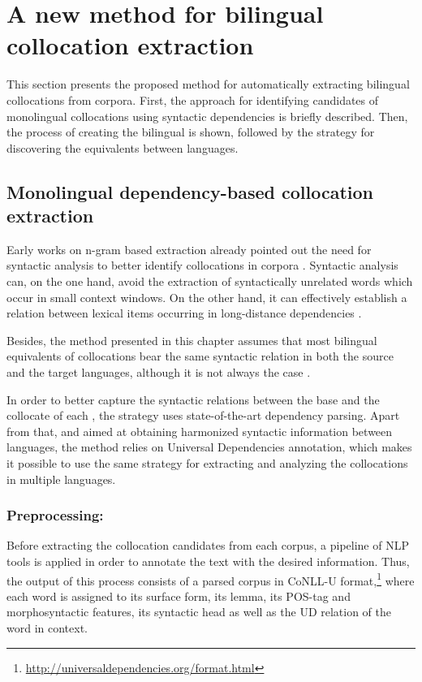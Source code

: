 \documentclass[output=paper
,modfonts
,nonflat]{langsci/langscibook}
\begin{document}
%
\section{A new method for bilingual collocation extraction}
\label{garcia:sec:method}
This section presents the proposed method for automatically extracting bilingual collocations from corpora.
First, the approach for identifying candidates of monolingual collocations using syntactic dependencies
is briefly described. Then, the process of creating the bilingual  is shown,
followed by the strategy for discovering the  equivalents between languages.

%
\subsection{Monolingual dependency-based collocation extraction}
\label{garcia:sec:monolingual}
Early works on n-gram based  extraction already pointed out the
need for syntactic analysis to better identify collocations in corpora
\citep{smadja1993,lin1999}. Syntactic analysis can, on the one hand, avoid the
extraction of syntactically unrelated words which occur in small context
windows. On the other hand, it can effectively establish a relation
between lexical items occurring in long-distance dependencies \citep{evert2008}.

Besides, the method presented
in this chapter assumes that most bilingual equivalents of collocations bear the same syntactic
relation in both the source and the target languages, although it is not always the case \citep{lu2004}.

In order to better capture the syntactic relations between the base and
the collocate of each , the strategy uses state-of-the-art dependency
parsing. Apart from that, and aimed at obtaining harmonized syntactic information
between languages, the method relies on Universal Dependencies annotation,
which makes it possible to use the same strategy for extracting and analyzing the collocations in multiple
languages.%

\subsubsection{Preprocessing:} Before extracting the collocation candidates from each
corpus, a pipeline of NLP tools is applied in order to annotate the text with the
desired information. Thus, the output of this process consists of a parsed corpus
in CoNLL-U format,\footnote{\scriptsize{\url{http://universaldependencies.org/format.html}}} where each word is assigned to its surface form, its lemma, its
POS-tag and morphosyntactic features, its syntactic head as well as the UD
relation of the word in context.
\end{document}
